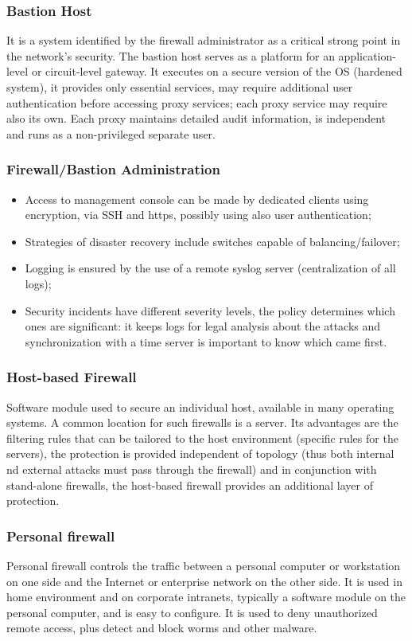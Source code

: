 \documentclass[a4paper, 10pt, titlepage]{article}
\begin{document}
\subsubsection*{Bastion Host}
It is a system identified by the firewall administrator as a critical strong point in the network's security. The bastion host serves as a platform for an application-level or circuit-level gateway. It executes on a secure version of the OS (hardened system), it provides only essential services, may require additional user authentication before accessing proxy services; each proxy service may require also its own. Each proxy maintains detailed audit information, is independent and runs as a non-privileged separate user.

\subsubsection*{Firewall/Bastion Administration}
\begin{itemize}
	\item Access to management console can be made by dedicated clients using encryption, via SSH and https, possibly using also user authentication;
	\item Strategies of disaster recovery include switches capable of balancing/failover;
	\item Logging is ensured by the use of a remote syslog server (centralization of all logs);
	\item Security incidents have different severity levels, the policy determines which ones are significant: it keeps logs for legal analysis about the attacks and synchronization with a time server is important to know which came first.
\end{itemize}

\subsubsection*{Host-based Firewall}
Software module used to secure an individual host, available in many operating systems. A common location for such firewalls is a server. Its advantages are the filtering rules that can be tailored to the host environment (specific rules for the servers), the protection is provided independent of topology (thus both internal nd external attacks must pass through the firewall) and in conjunction with stand-alone firewalls, the host-based firewall provides an additional layer of protection.

\subsubsection*{Personal firewall}
Personal firewall controls the traffic between a personal computer or workstation on one side and the Internet or enterprise network on the other side. It is used in home environment and on corporate intranets, typically a software module on the personal computer, and is easy to configure. It is used to deny unauthorized remote access, plus detect and block worms and other malware.
\end{document}
